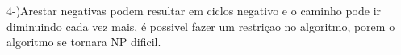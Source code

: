 4-)Arestar negativas podem resultar em ciclos negativo e o caminho pode ir diminuindo cada vez mais,
é possivel fazer um restriçao no algoritmo, porem o algoritmo se tornara NP dificil.
